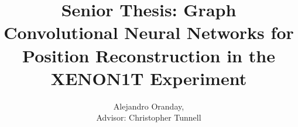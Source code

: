 

\title{Senior Thesis: Graph Convolutional Neural Networks for Position Reconstruction in the XENON1T Experiment}
\author{Alejandro Oranday, \\ Advisor: Christopher Tunnell}
\date{}


	\maketitle
	\linenumbers
	\pagebreak

